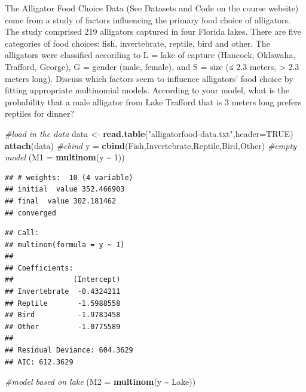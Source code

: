 \documentclass[
]{article}
\newenvironment{Shaded}{\begin{snugshade}}{\end{snugshade}}
\newcommand{\AttributeTok}[1]{\textcolor[rgb]{0.13,0.29,0.53}{#1}}
\newcommand{\CommentTok}[1]{\textcolor[rgb]{0.56,0.35,0.01}{\textit{#1}}}
\newcommand{\ConstantTok}[1]{\textcolor[rgb]{0.56,0.35,0.01}{#1}}
\newcommand{\DecValTok}[1]{\textcolor[rgb]{0.00,0.00,0.81}{#1}}
\newcommand{\FunctionTok}[1]{\textcolor[rgb]{0.13,0.29,0.53}{\textbf{#1}}}
\newcommand{\NormalTok}[1]{#1}
\newcommand{\OtherTok}[1]{\textcolor[rgb]{0.56,0.35,0.01}{#1}}
\newcommand{\SpecialCharTok}[1]{\textcolor[rgb]{0.81,0.36,0.00}{\textbf{#1}}}
\newcommand{\StringTok}[1]{\textcolor[rgb]{0.31,0.60,0.02}{#1}}
\begin{document}
The Alligator Food Choice Data (See Datasets and Code on the course
website) come from a study of factors influencing the primary food
choice of alligators. The study comprised 219 alligators captured in
four Florida lakes. There are five categories of food choices: fish,
invertebrate, reptile, bird and other. The alligators were classified
according to L = lake of capture (Hancock, Oklawaha, Trafford, George),
G = gender (male, female), and S = size (≤ 2.3 meters, \textgreater{}
2.3 meters long). Discuss which factors seem to influence alligators'
food choice by fitting appropriate multinomial models. According to your
model, what is the probability that a male alligator from Lake Trafford
that is 3 meters long prefers reptiles for dinner?

\begin{Shaded}
\begin{Highlighting}[]
\CommentTok{\#load in the data}
\NormalTok{data }\OtherTok{\textless{}{-}} \FunctionTok{read.table}\NormalTok{(}\StringTok{"alligatorfood{-}data.txt"}\NormalTok{,}\AttributeTok{header=}\ConstantTok{TRUE}\NormalTok{)}
\FunctionTok{attach}\NormalTok{(data)}
\CommentTok{\#cbind}
\NormalTok{y }\OtherTok{=} \FunctionTok{cbind}\NormalTok{(Fish,Invertebrate,Reptile,Bird,Other)}
\CommentTok{\#empty model}
\NormalTok{(}\AttributeTok{M1 =} \FunctionTok{multinom}\NormalTok{(y }\SpecialCharTok{\textasciitilde{}} \DecValTok{1}\NormalTok{))}
\end{Highlighting}
\end{Shaded}

\begin{verbatim}
## # weights:  10 (4 variable)
## initial  value 352.466903 
## final  value 302.181462 
## converged
\end{verbatim}

\begin{verbatim}
## Call:
## multinom(formula = y ~ 1)
## 
## Coefficients:
##              (Intercept)
## Invertebrate  -0.4324211
## Reptile       -1.5988558
## Bird          -1.9783458
## Other         -1.0775589
## 
## Residual Deviance: 604.3629 
## AIC: 612.3629
\end{verbatim}

\begin{Shaded}
\begin{Highlighting}[]
\CommentTok{\#model based on lake}
\NormalTok{(}\AttributeTok{M2 =} \FunctionTok{multinom}\NormalTok{(y }\SpecialCharTok{\textasciitilde{}}\NormalTok{ Lake))}
\end{Highlighting}
\end{Shaded}
\end{document}
